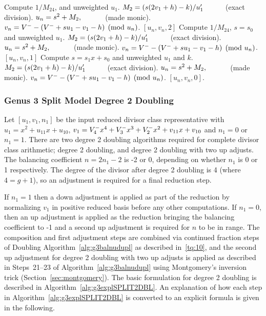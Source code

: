 \begin{subroutine}[htbp]
\begin{algorithmic} [1]
                \Else \hspace{2pt} Compute $1/M_{24}$, and unweighted $u_1$.
                    \State $M_2 = (s(2v_1 + h) - k)/u'_1 \quad\quad\quad $(exact division).
                    \State $u_n = s^2 + M_2, \quad\quad\quad $ (made monic).
                    \State $v_n = V^{-} - (V^{-} + su_1 - v_1 - h) \pmod{u_n}$.
                    \State \Return $[u_n,v_n,2]$
                \EndIf
            \EndIf
            \State Compute $1/M_{24}$, $s = s_0$ and unweighted $u_1$.
            \State $M_2 = (s(2v_1 + h) - k)/u'_1 \quad\quad\quad $(exact division).
            \State $u_n = s^2 + M_2, \quad\quad\quad $ (made monic).
            \State $v_n = V^{-} - (V^{-} + su_1 - v_1 - h) \pmod{u_n}$.
            \State \Return $[u_n,v_n,1]$
        \EndIf
    \EndIf
    \State Compute $s = s_1x + s_0$ and unweighted $u_1$ and $k$.
    \State $M_2 = (s(2v_1 + h) - k)/u'_1 \quad\quad\quad $(exact division).
    \State $u_n = s^2 + M_2, \quad\quad\quad $ (made monic).
    \State $v_n = V^{-} - (V^{-} + su_1 - v_1 - h) \pmod{u_n}$.
    \State \Return $[u_n,v_n,0]$.
\EndIf
\end{algorithmic}
\end{subroutine}


\newpage
\subsubsection{Genus 3 Split Model Degree 2 Doubling}
Let $[u_1,v_1,n_1]$ be the input reduced divisor class representative with $u_1
= x^2 + u_{11}x + u_{10}$, $v_1 = V^{-}_4x^4 + V^{-}_3x^3 + V^{-}_2x^2 + v_{11}x +
v_{10}$ and $n_1 = 0$ or $n_1 = 1$. There are two degree 2 doubling algorithms
required for complete divisor class arithmetic; degree 2 doubling, and degree 2
doubling with two up adjusts. The balancing coefficient $n = 2n_1 - 2$ is -2 or
0, depending on whether $n_1$ is 0 or 1 respectively. The degree of the divisor
after degree 2 doubling is 4 (where $4 = g + 1$), so an adjustment is required
for a final reduction step. 

If $n_1 = 1$ then a down adjustment is applied as part of the reduction by
normalizing $v_1$ in positive reduced basis before any other computations. If
$n_1=0$, then an up adjustment is applied as the reduction bringing the
balancing coefficient to -1 and a second up adjustment is required for $n$ to be
in range. The composition and first adjustment steps are combined via continued
fraction steps of Doubling Algorithm~\ref{alg:g3balnudupl} as described
in~\ref{tq:10}, and the second up adjustment for degree 2 doubling with two up
adjusts is applied as described in Steps~21--23 of
Algorithm~\ref{alg:g3balnudupl} using Montgomery's inversion trick
(Section~\ref{sec:montgomery}). The basic formulation for degree 2 doubling is
described in Algorithm~\ref{alg:g3explSPLIT2DBL}. An explanation of how each
step in Algorithm~\ref{alg:g3explSPLIT2DBL} is converted to an explicit formula
is given in the following.

